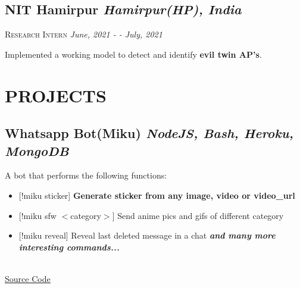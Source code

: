 \documentclass[12pt]{article}
\begin{document}
\subsection*{NIT Hamirpur \hfill \normalsize \normalfont \textit{Hamirpur(HP), India}}
\vspace{-1ex}
\textsc{\textmd{Research Intern}} \hfill \normalsize \textit{June, 2021 - - July, 2021}
\vspace{-1ex}

\begin{description}
\setlength{\itemindent}{2\parindent}
\setlength{\itemsep}{0em}
\item[$\bullet$]{Implemented a working model to detect and identify \textbf{evil twin AP's}.}
\end{description}


\section{PROJECTS}

\subsection*{Whatsapp Bot(Miku) \hfill \normalsize \textit{NodeJS, Bash, Heroku, MongoDB}}
  \parbox{\textwidth}{ A bot that performs the following functions:   
\setlength{\itemsep}{0em}
  \begin{itemize}
    \item{[!miku sticker] \textbf{Generate sticker from any image, video or video\_url }}
    \item{[!miku sfw $<$category$>$] Send anime pics and gifs of different category}
    \item{[!miku reveal] Reveal last deleted message in a chat}
      \emph{\textbf{and many more interesting commands...}}
  \end{itemize}
  \\ \underline{\href{https://github.com/HARSH-SHETH/miku}{Source Code}}
  }
  \vspace{2mm}
\end{document}

